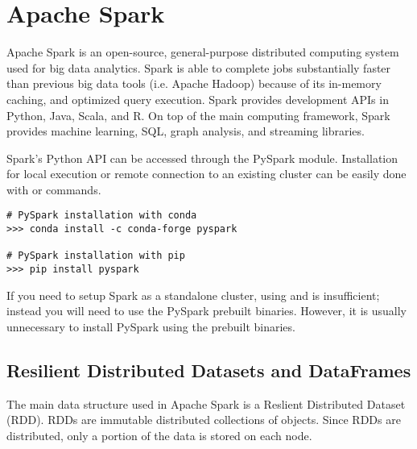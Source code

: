 
\section*{Apache Spark} %
Apache Spark is an open-source, general-purpose distributed computing system used for big data analytics. Spark is able to complete jobs substantially faster than previous big data tools (i.e. Apache Hadoop) because of its in-memory caching, and optimized query execution. Spark provides development APIs in Python, Java, Scala, and R. On top of the main computing framework, Spark provides machine learning, SQL, graph analysis, and streaming libraries.

Spark's Python API can be accessed through the PySpark module. Installation for local execution or remote connection to an existing cluster can be easily done with  or  commands.

\begin{lstlisting}
# PySpark installation with conda
>>> conda install -c conda-forge pyspark

# PySpark installation with pip
>>> pip install pyspark
\end{lstlisting}

\begin{warn}
If you need to setup Spark as a standalone cluster, using  and  is insufficient; instead you will need to use the PySpark prebuilt binaries. However, it is usually unnecessary to install PySpark using the prebuilt binaries.
\end{warn}

\subsection*{Resilient Distributed Datasets and DataFrames} %
The main data structure used in Apache Spark is a Reslient Distributed Dataset (RDD). RDDs are immutable distributed collections of objects. Since RDDs are distributed, only a portion of the data is stored on each node. 

